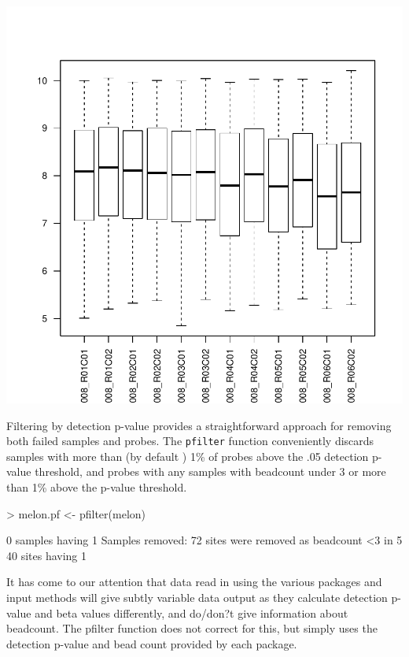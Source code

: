 \documentclass[11pt]{article}
\newcommand{\Rfunction}[1]{{\texttt{#1}}}
\begin{document}
\includegraphics{wateRmelon-IncludeGraphic}

Filtering by detection p-value provides a straightforward 
approach for removing both failed samples and probes.  
The \Rfunction{pfilter} function
conveniently discards samples with more than (by default ) 1\% of 
probes above the .05 detection p-value threshold, and probes with any samples
with beadcount under 3 or more than 1\% above the p-value threshold.

\begin{Schunk}
\begin{Sinput}
> melon.pf <- pfilter(melon)
\end{Sinput}
\begin{Soutput}
0 samples having 1 %
Samples removed:  
72 sites were removed as beadcount <3 in 5 %
40 sites having 1 %
\end{Soutput}
\end{Schunk}

It has come to our attention that data read in using the various packages and 
input methods will give subtly variable data output as they 
calculate detection p-value and beta values differently, and do/don?t give 
information about beadcount.  The pfilter function does not correct 
for this, but simply uses the detection p-value and bead count 
provided by each package.
\end{document}
